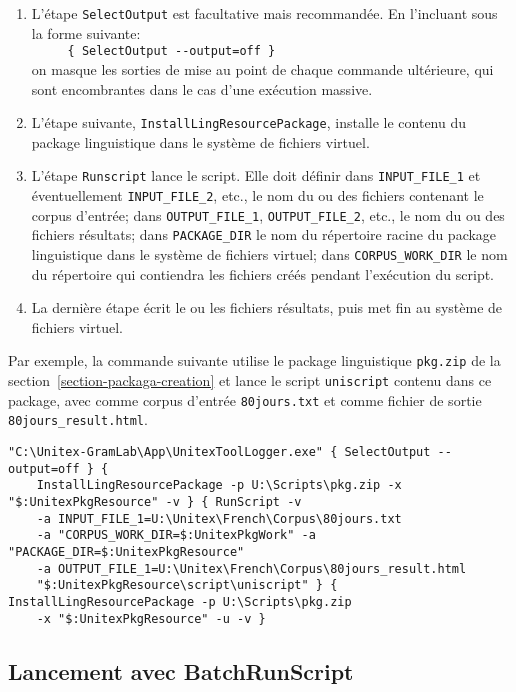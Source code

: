 \begin{enumerate}
\item L'étape \verb$SelectOutput$ est facultative mais recommandée. En l'incluant sous la forme
suivante:\\
\verb$     { SelectOutput --output=off }$\\
on masque les sorties de mise au point de chaque commande ultérieure, qui sont encombrantes
dans le cas d'une exécution massive.
\item L'étape suivante, \verb$InstallLingResourcePackage$, installe le contenu du package linguistique
dans le système de fichiers virtuel.
\item L'étape \verb$Runscript$ lance le script. Elle doit définir dans  \verb$INPUT_FILE_1$ et
éventuellement \verb$INPUT_FILE_2$, etc., le nom du ou des fichiers contenant le corpus d'entrée; dans
\verb$OUTPUT_FILE_1$, \verb$OUTPUT_FILE_2$, etc., le nom du ou des fichiers résultats;
dans \verb$PACKAGE_DIR$ le nom du répertoire racine du package linguistique dans le système
de fichiers virtuel; dans \verb$CORPUS_WORK_DIR$ le nom du répertoire qui contiendra les fichiers
créés pendant l'exécution du script.
\item La dernière étape écrit le ou les fichiers résultats, puis met fin au système de fichiers virtuel.
\end{enumerate}

\noindent Par exemple, la commande suivante utilise le package linguistique \verb$pkg.zip$ de la
section~\ref{section-packaga-creation} et lance
le script \verb$uniscript$ contenu dans ce package, avec comme corpus d'entrée \verb$80jours.txt$
et comme fichier de sortie \verb$80jours_result.html$.

\begin{Verbatim}[fontsize=\small,fontfamily=helvetica]
"C:\Unitex-GramLab\App\UnitexToolLogger.exe" { SelectOutput --output=off } {
    InstallLingResourcePackage -p U:\Scripts\pkg.zip -x "$:UnitexPkgResource" -v } { RunScript -v
    -a INPUT_FILE_1=U:\Unitex\French\Corpus\80jours.txt 
    -a "CORPUS_WORK_DIR=$:UnitexPkgWork" -a "PACKAGE_DIR=$:UnitexPkgResource"
    -a OUTPUT_FILE_1=U:\Unitex\French\Corpus\80jours_result.html 
    "$:UnitexPkgResource\script\uniscript" } { InstallLingResourcePackage -p U:\Scripts\pkg.zip 
    -x "$:UnitexPkgResource" -u -v }
\end{Verbatim}



\subsection{Lancement avec BatchRunScript}
\label{launch-script}

